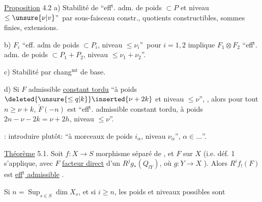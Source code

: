 \uline{Proposition} 4.2  a) Stabilité de \textquotedblleft eff$^{\mathrm t}$. adm. de poids $\subset P$ et niveau $\leq\unsure{\nu|v}$\textquotedblright\ par sous-faisceau constr., quotients constructibles, sommes finies, extensions.

b) $F_i$ \textquotedblleft eff. adm de poids $\subset P_i$, niveau $\leq\nu_i$\textquotedblright\ pour $i=1,2$ implique $F_1\otimes F_2$ \textquotedblleft eff$^{\mathrm t}$. adm. de poids $\subset P_1+P_2$, niveau $\leq\nu_1+\nu_2$\textquotedblright.

c) Stabilité par chang$^{\mathrm{mt}}$ de base.

d) Si $F$  admissible \uline{constant tordu} \textquotedblleft à poids $\deleted{\unsure{\leq q|k}}\inserted{\nu+2k}$ et niveau $\leq\nu$\textquotedblright, , alors pour tout $n\geq\nu+k$, $\check F(-n)$ est \textquotedblleft eff$^{\mathrm t}$. admissible constant tordu, à poids $2n-\nu-2k=\nu+2h$, niveau $\leq\nu$\textquotedblright.

\uline{}: introduire plutôt: \textquotedblleft à morceaux de poids $i_\alpha$, niveau $\nu_\alpha$\textquotedblright, $\alpha\in\ldots$\textquotedblright.

\uline{Théorème} 5.1. Soit $f:X\longrightarrow S$ morphisme séparé de , et $F$  sur $X$ (i.e. déf. 1 s'applique, avec $F$ \uline{facteur direct} d'un $R^jg_*(Q_{lY})$, où $g:Y\longrightarrow X$ ).  Alors $R^if_!(F)$ est \uline{eff$^{\mathrm t}$ admissible}  .

Si $n=\operatorname{Sup}_{s\in S}\dim X_s$,  et si $i\geq n$, les poids  et niveaux  possibles sont

